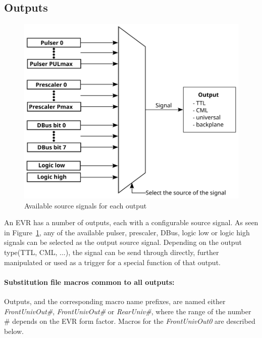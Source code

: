 \documentclass[12pt,a4paper]{article}
\begin{document}
\subsection{Outputs}\label{sec:Outputs}
\begin{figure}[H]
	\centering
	\includegraphics[]{./img/output}
	\caption{Available source signals for each output}
	\label{fig:output}
\end{figure}

An EVR has a number of outputs, each with a configurable source signal. As seen in Figure~\ref{fig:output}, any of the available pulser, prescaler, DBus, logic low or logic high signals can be selected as the output source signal. Depending on the output type(TTL, CML, ...), the signal can be send through directly, further manipulated or used as a trigger for a special function of that output.

\paragraph{Substitution file macros common to all outputs:} Outputs, and the corresponding macro name prefixes, are named either \emph{FrontUnivOut\#},\emph{ FrontUnivOut\#} or \emph{RearUniv\#}, where the range of the number \# depends on the EVR form factor. Macros for the \emph{FrontUnivOut0} are described below. 
\end{document}
